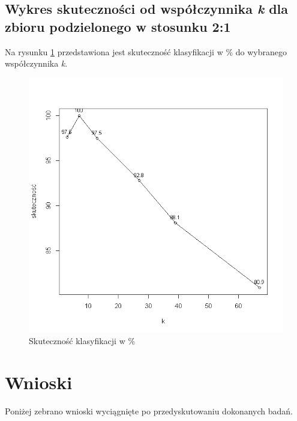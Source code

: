 \documentclass[12pt]{article}
\begin{document}
\subsection{Wykres skuteczności od współczynnika \textit{k} dla zbioru podzielonego w stosunku 2:1}
Na rysunku \ref{wykres_k} przedstawiona jest skuteczność klasyfikacji w \% do wybranego współczynnika \textit{k}.
\begin{figure}[h!]
 \centering
 \includegraphics[scale=0.4]{R_knn.png}
 \vspace{-0.1cm}
 \caption{Skuteczność klasyfikacji w \%}
 \label{wykres_k}
\end{figure}

\section{Wnioski}
Poniżej zebrano wnioski wyciągnięte po przedyskutowaniu dokonanych badań. \\
\end{document}
